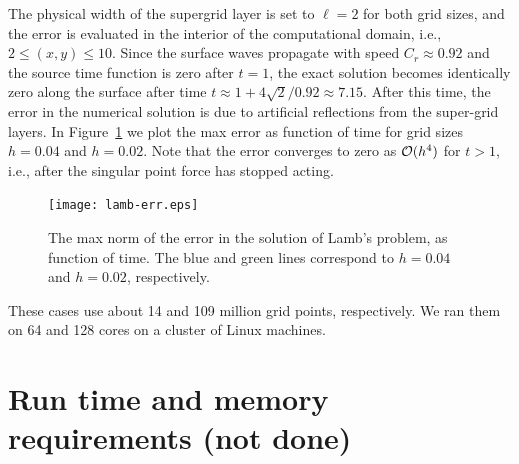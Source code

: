 \documentclass[11pt]{report}
\begin{document}
The physical width of the supergrid layer is set to $\ell=2$ for both grid sizes, and the error is
evaluated in the interior of the computational domain, i.e., $2\leq (x,y) \leq 10$. Since the
surface waves propagate with speed $C_r\approx 0.92$ and the source time function is zero after
$t=1$, the exact solution becomes identically zero along the surface after time $t\approx 1 +
4\sqrt{2}/0.92 \approx 7.15$. After this time, the error in the numerical solution is due to
artificial reflections from the super-grid layers. In Figure~\ref{fig:lamb-err} we plot the max
error as function of time for grid sizes $h=0.04$ and $h=0.02$. Note that the error converges to
zero as ${\cal O}(h^4)$ for $t>1$, i.e., after the singular point force has stopped acting.
\begin{figure}[ht]
\begin{center}
\texttt{[image: lamb-err.eps]}
\caption{The max norm of the error in the solution of Lamb's problem, as function of time. The blue
and green lines correspond to $h=0.04$ and $h=0.02$, respectively.}
\label{fig:lamb-err}
\end{center}
\end{figure}

These cases use about 14 and 109 million grid points, respectively. We ran them on 64 and 128 cores
on a cluster of Linux machines.


\chapter{Run time and memory requirements (not done)}\label{sec:performance}
\end{document}
